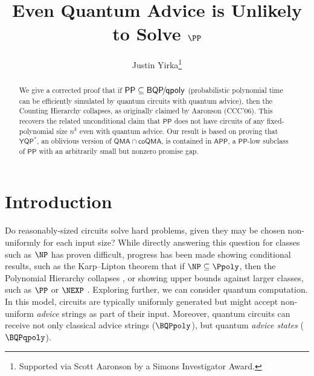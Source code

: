 \documentclass{toc}
\begin{document}
\begin{frontmatter}%

%
%
%

%
\title{Even Quantum Advice is Unlikely to Solve \texorpdfstring{$\PP$}{PP}}  %

%
%

%
%
%
%
%
%

%
%
%
%
%
%
%
%
%
%
%
%


%
%
%
%

%

\author[yirka]{Justin Yirka\thanks{Supported via Scott Aaronson by a Simons Investigator Award.}}

%
%
%
%

%
%
%
%
%
%
%
%
%
%
%
%
%
%
%
\begin{abstract}
	We give a corrected proof that if
%
    $\mathsf{PP} \subseteq \mathsf{BQP\!/\hspace{-0.11em}qpoly}$ %
%
%
		(probabilistic polynomial time can be efficiently simulated by
		quantum circuits with quantum advice), %
        then the Counting Hierarchy collapses,
	as originally claimed %
        by Aaronson (CCC'06). %
	This recovers the related unconditional claim that %
	$\mathsf{PP}$ does not have circuits %
%
%
	of any fixed-polynomial %
        size $n^k$ even with quantum advice.
%
%
Our result is based on  %
proving that %
%
%
$\mathsf{YQP^*}$,
an oblivious version of %
$\mathsf{QMA}\cap\mathsf{coQMA}$, %
is contained in %
%
%
%
%
$\mathsf{APP}$,
a $\mathsf{PP}$-low subclass of $\mathsf{PP}$ with an arbitrarily small but nonzero promise gap.
%
\end{abstract}

%

\end{frontmatter}

%
%
%

%
%

%
\section{Introduction}

Do reasonably-sized circuits solve hard problems, 
given they may be chosen non-uniformly for each input size?
While directly answering this question for classes such as $\NP$ has proven difficult,
progress has been made showing conditional results,
such as the Karp--Lipton theorem that if $\NP\subseteq \Ppoly$,
then the Polynomial Hierarchy collapses \cite{karp1980some},
or showing upper bounds against larger classes,
such as $\PP$ or $\NEXP$ \cite{vinodchandran2005note,williams2014nonuniform}.
Exploring further, we can consider quantum computation.
In this model, circuits are typically uniformly generated
but might accept non-uniform \emph{advice} strings as part of their input.
Moreover, quantum circuits can receive not only classical
advice strings ($\BQPpoly$), but quantum \emph{advice states} ($\BQPqpoly$).
\end{document}
